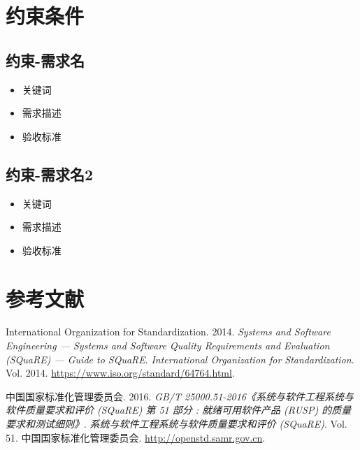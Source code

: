 \documentclass[hyperref, a4paper]{ctexart}
\providecommand{\tightlist}{%
  \setlength{\itemsep}{0pt}\setlength{\parskip}{0pt}}
\begin{document}
\hypertarget{ux7ea6ux675fux6761ux4ef6}{%
\section{约束条件}\label{ux7ea6ux675fux6761ux4ef6}}

\hypertarget{ux7ea6ux675f-ux9700ux6c42ux540d}{%
\subsection{约束-需求名}\label{ux7ea6ux675f-ux9700ux6c42ux540d}}

\begin{itemize}
\tightlist
\item
  关键词
\item
  需求描述
\item
  验收标准
\end{itemize}

\hypertarget{ux7ea6ux675f-ux9700ux6c42ux540d2}{%
\subsection{约束-需求名2}\label{ux7ea6ux675f-ux9700ux6c42ux540d2}}

\begin{itemize}
\tightlist
\item
  关键词
\item
  需求描述
\item
  验收标准
\end{itemize}

\pagebreak

\hypertarget{ux53c2ux8003ux6587ux732e}{%
\section*{参考文献}\label{ux53c2ux8003ux6587ux732e}}

\hypertarget{refs}{}
\leavevmode\hypertarget{ref-innovativeInternationalisation}{}%
International Organization for Standardization. 2014. \emph{Systems and
Software Engineering --- Systems and Software Quality Requirements and
Evaluation (SQuaRE) --- Guide to SQuaRE}. \emph{International
Organization for Standardization}. Vol. 2014.
\url{https://www.iso.org/standard/64764.html}.

\leavevmode\hypertarget{ref-innovative1}{}%
中国国家标准化管理委员会. 2016. \emph{GB/T
25000.51-2016《系统与软件工程系统与软件质量要求和评价 (SQuaRE) 第 51
部分 : 就绪可用软件产品 (RUSP) 的质量要求和测试细则》}.
\emph{系统与软件工程系统与软件质量要求和评价 (SQuaRE)}. Vol. 51.
中国国家标准化管理委员会. \url{http://openstd.samr.gov.cn}.
\end{document}
